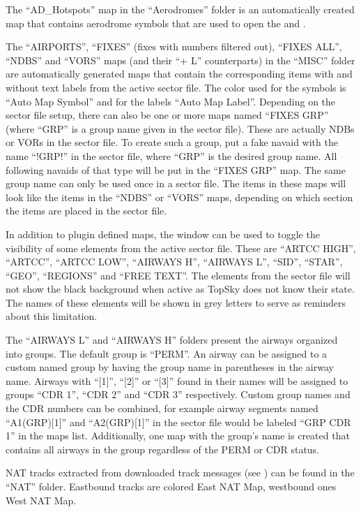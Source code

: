 \documentclass[11pt,a4paper]{memoir}
\begin{document}
The “AD\_Hotspots” map in the “Aerodromes” folder is an automatically created map that contains aerodrome symbols that are used to open the \textit{} and \textit{}.

The “AIRPORTS”, “FIXES” (fixes with numbers filtered out), “FIXES ALL”, “NDBS” and “VORS” maps (and their “+ L” counterparts) in the “MISC” folder are automatically generated maps that contain the corresponding items with and without text labels from the active sector file. The color used for the symbols is “Auto Map Symbol” and for the labels “Auto Map Label”. Depending on the sector file setup, there can also be one or more maps named “FIXES GRP” (where “GRP” is a group name given in the sector file). These are actually NDBs or VORs in the sector file. To create such a group, put a fake navaid with the name “!GRP!” in the sector file, where “GRP” is the desired group name. All following navaids of that type will be put in the “FIXES GRP” map. The same group name can only be used once in a sector file. The items in these maps will look like the items in the “NDBS” or “VORS” maps, depending on which section the items are placed in the sector file.

In addition to plugin defined maps, the window can be used to toggle the visibility of some elements from the active sector file. These are “ARTCC HIGH”, “ARTCC”, “ARTCC LOW”, “AIRWAYS H”, “AIRWAYS L”, “SID”, “STAR”, “GEO”, “REGIONS” and “FREE TEXT”. The elements from the sector file will not show the black background when active as TopSky does not know their state. The names of these elements will be shown in grey letters to serve as reminders about this limitation.

The “AIRWAYS L” and “AIRWAYS H” folders present the airways organized into groups. The default group is “PERM”. An airway can be assigned to a custom named group by having the group name in parentheses in the airway name. Airways with “[1]”, “[2]” or “[3]” found in their names will be assigned to groups “CDR 1”, “CDR 2” and “CDR 3” respectively. Custom group names and the CDR numbers can be combined, for example airway segments named “A1(GRP)[1]” and “A2(GRP)[1]” in the sector file would be labeled “GRP CDR 1” in the maps list. Additionally, one map with the group’s name is created that contains all airways in the group regardless of the PERM or CDR status.

NAT tracks extracted from downloaded track messages (see \textit{}) can be found in the “NAT” folder. Eastbound tracks are colored East NAT Map, westbound ones West NAT Map.
\end{document}
